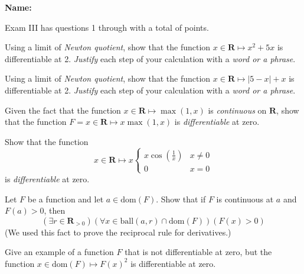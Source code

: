 \documentclass[12pt,fleqn]{exam}
\newcommand{\reals}{\mathbf{R}}
\newcommand{\dom}{\mbox{dom}}
\newcommand{\ball}{\mathrm{ball}}
\newcommand{\quiz}{III}
\newcommand{\term}{Fall}
\begin{document}
\large
\vspace{0.1in}
\noindent{}
{\bf Name:}  \\
\noindent \makebox[3.0truein][l]{\bf Exam   \quiz, \term \/ \the\year}
\vspace{0.1in}

\noindent  Exam   \quiz\/  has questions 1 through  \numquestions \/ 
with a total of  \numpoints\/  points.   

\vspace{0.1in}


\begin{questions} 

\question[10] Using a limit of \emph{Newton quotient}, show that the function
$x \in \reals \mapsto x^2+ 5 x$ is differentiable at 2. \emph{Justify} each step of
your calculation with a \emph{word or a phrase}.

\begin{solution}%
\end{solution}

\newpage

\question[10] Using a limit of \emph{Newton quotient}, show that the function
$x \in \reals \mapsto |5-x| + x$ is differentiable at 2. \emph{Justify} each step of
your calculation with a \emph{word or a phrase}.

\begin{solution}%
\end{solution}
\newpage
\question [10] Given the fact that the function $x \in \reals \mapsto \max(1,x)$ is 
\emph{continuous} on $\reals$, show that the function 
$F = x \in \reals \mapsto x \max(1,x)$ is \emph{differentiable} at zero.


\begin{solution}%
\end{solution}
\newpage

\question [10] Show that the function
\begin{equation*}
    x \in \reals \mapsto x \begin{cases} 
             x \cos \left(\frac{1}{x} \right) & x \neq 0 \\
             0   & x = 0
    \end{cases}  
\end{equation*}
is \emph{differentiable} at zero.
\begin{solution}%
\end{solution}

\newpage
\question [10] Let $F$ be a function and let $a \in \dom(F)$.  Show that if
$F$ is continuous at $a$ and $F(a) > 0$,  then
\begin{equation*}
    \left(\exists r \in \reals_{>0} \right)
    \left(\forall x \in \ball(a,r) \cap \dom(F) \right)
    \left (F(x) > 0 \right)
\end{equation*}
(We used this fact to prove the reciprocal rule for derivatives.)


\newpage

\question [10] Give an example of a function $F$ that is not differentiable at zero, but 
the function $x \in \dom(F) \mapsto F(x)^2$ is differentiable at zero.

\end{questions}
\end{document}

